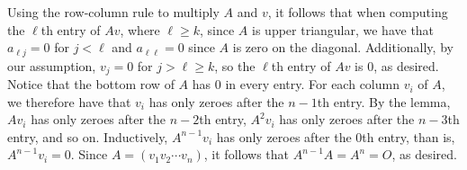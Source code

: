 Using the row-column rule to multiply $A$ and $v$,
it follows that when computing the $\ell$th entry of $Av$, where $\ell \ge k$,
since $A$ is upper triangular, we have that $a_{\ell j} = 0$ for $j < \ell$
and $a_{\ell \ell} = 0$ since $A$ is zero on the diagonal.
Additionally, by our assumption, $v_j = 0$ for $j > \ell \ge k$,
so the $\ell$th entry of $Av$ is $0$, as desired.
\medskip
Notice that the bottom row of $A$ has $0$ in every entry.
For each column $v_i$ of $A$, we therefore have that $v_i$
has only zeroes after the $n-1$th entry.
By the lemma, $Av_i$ has only zeroes after the $n-2$th entry,
$A^2 v_i$ has only zeroes after the $n-3$th entry, and so on.
Inductively, $A^{n-1} v_i$ has only zeroes after the $0$th entry,
than is, $A^{n-1} v_i = 0$.
Since $A = (v_1 v_2 \cdots v_n)$, it follows that
$A^{n-1} A = A^n = O$, as desired.
\bye
